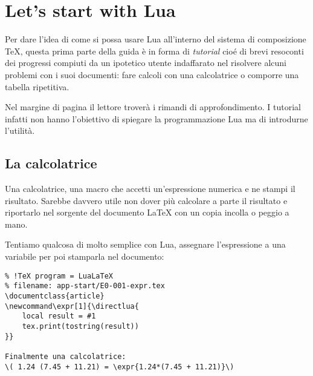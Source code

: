


\chapter{Let's start with Lua}
\label{chGo}

Per dare l'idea di come si possa usare Lua all'interno del sistema di
composizione \TeX{}, questa prima parte della guida è in forma di
\emph{tutorial} cioé di brevi resoconti dei progressi compiuti da un ipotetico
utente \LuaLaTeX{} indaffarato nel risolvere alcuni problemi con i suoi
documenti: fare calcoli con una calcolatrice o comporre una tabella ripetitiva.

Nel margine di pagina il lettore troverà i rimandi di approfondimento. I
tutorial infatti non hanno l'obiettivo di spiegare la programmazione Lua ma di
introdurne l'utilità.


\section{La calcolatrice}

Una calcolatrice, una macro  che accetti un'espressione numerica e
ne stampi il risultato. Sarebbe davvero utile non dover più calcolare a
parte il risultato e riportarlo nel sorgente del documento \LaTeX{} con un copia
incolla o peggio a mano.

Tentiamo qualcosa di molto semplice con Lua, assegnare l'espressione a una
variabile per poi stamparla nel documento:
%
%
%
%
\begin{Verbatim}
% !TeX program = LuaLaTeX
% filename: app-start/E0-001-expr.tex
\documentclass{article}
\newcommand\expr[1]{\directlua{
    local result = #1
    tex.print(tostring(result))
}}

Finalmente una calcolatrice:
\( 1.24 (7.45 + 11.21) = \expr{1.24*(7.45 + 11.21)}\)

\end{Verbatim}

